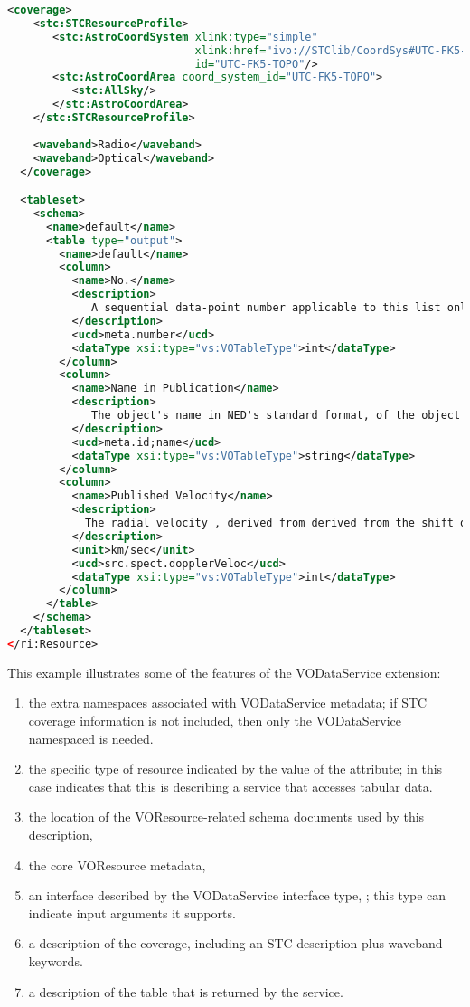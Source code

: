 \documentclass[11pt,a4paper]{ivoa}
\begin{document}
\begin{lstlisting}[language=XML]
  <coverage>
    <stc:STCResourceProfile>
       <stc:AstroCoordSystem xlink:type="simple"
                             xlink:href="ivo://STClib/CoordSys#UTC-FK5-TOPO" 
                             id="UTC-FK5-TOPO"/> 
       <stc:AstroCoordArea coord_system_id="UTC-FK5-TOPO">
          <stc:AllSky/>
       </stc:AstroCoordArea>
    </stc:STCResourceProfile>
    
    <waveband>Radio</waveband>
    <waveband>Optical</waveband>
  </coverage>

  <tableset>
    <schema>
      <name>default</name>
      <table type="output">
        <name>default</name>
        <column>
          <name>No.</name>
          <description>
             A sequential data-point number applicable to this list only.
          </description>
          <ucd>meta.number</ucd>
          <dataType xsi:type="vs:VOTableType">int</dataType>
        </column>
        <column>
          <name>Name in Publication</name>
          <description>
             The object's name in NED's standard format, of the object to which the data apply.
          </description>
          <ucd>meta.id;name</ucd>
          <dataType xsi:type="vs:VOTableType">string</dataType>
        </column>
        <column>
          <name>Published Velocity</name>
          <description>
            The radial velocity , derived from derived from the shift of some spectral feature, in km/sec
          </description>
          <unit>km/sec</unit>
          <ucd>src.spect.dopplerVeloc</ucd>
          <dataType xsi:type="vs:VOTableType">int</dataType>
        </column>
      </table>
    </schema>
  </tableset>
</ri:Resource>
\end{lstlisting}

This example illustrates some of the features of the VODataService
extension:

\begin{enumerate}
\item the extra namespaces associated with
       VODataService metadata; if STC coverage information
       \citep{STC} is not
       included, then only the VODataService namespaced is needed.
\item the specific type of resource indicated by
       the value of the  attribute; in this case
        indicates that this is
       describing a service that accesses tabular data.
\item the location of the VOResource-related schema 
       documents used by this description,
\item the core VOResource metadata,
\item an interface described by the
       VODataService interface type, ; this
       type can indicate input arguments it supports.
\item a description of the
       coverage, including an STC
       description plus waveband keywords.
\item a description of the table that is returned
       by the service.
\end{enumerate}
\end{document}
